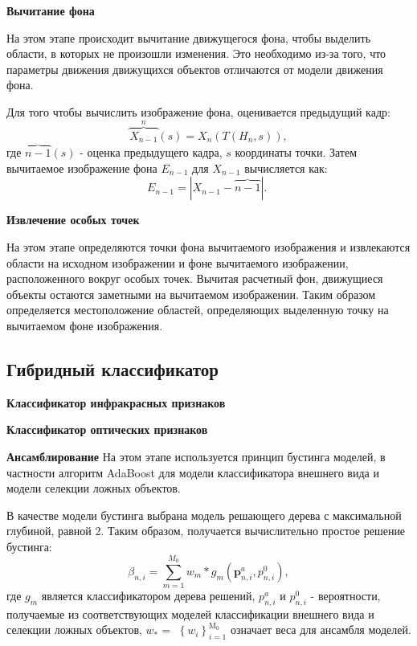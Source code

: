 \textbf{Вычитание фона}

На этом этапе происходит вычитание движущегося фона, чтобы выделить области, в которых не произошли изменения. Это необходимо из-за того, что параметры движения движущихся объектов отличаются от модели движения фона.

Для того чтобы вычислить изображение фона, оценивается предыдущий кадр:
\begin{equation}
\overbrace{X_{n-1}}^n(s)=X_n\left(T\left(H_n, s\right)\right),
\end{equation}
где $\overbrace{n-1}(s)$ - оценка предыдущего кадра, $s$ координаты точки. Затем вычитаемое изображение фона $E_{n-1}$ для $X_{n-1}$ вычисляется как:
\begin{equation}
E_{n-1}=|X_{n-1}-\overbrace{n-1}| \text {. }
\end{equation}

\textbf{Извлечение особых точек}

На этом этапе определяются точки фона вычитаемого изображения и извлекаются области на исходном изображении и фоне вычитаемого изображении, расположенного вокруг особых точек. Вычитая расчетный фон, движущиеся объекты остаются заметными на вычитаемом изображении. Таким образом определяется местоположение областей, определяющих выделенную точку на вычитаемом фоне изображения.

\subsection{Гибридный классификатор}

\textbf{Классификатор инфракрасных признаков}

\textbf{Классификатор оптических признаков}


\textbf{Ансамблирование}
На этом этапе используется принцип бустинга моделей, в частности алгоритм AdaBoost \cite{Freund1999ASI} для модели классификатора внешнего вида и модели селекции ложных объектов.

В качестве модели бустинга выбрана модель решающего дерева с максимальной глубиной, равной 2. Таким образом, получается вычислительно простое решение бустинга:
\begin{equation}
\beta_{n, i}=\sum_{m=1}^{M_0} w_m * g_m\left(\boldsymbol{p}_{n, i}^a, p_{n, i}^0\right),
\end{equation}
где $g_m$ является классификатором дерева решений, $p_{n, i}^a$ и $p_{n, i}^0$ - вероятности, получаемые из соответствующих моделей классификации внешнего вида и селекции ложных объектов, $w_*=$ $\left\{w_i\right\}_{i=1}^{\mathrm{M}_0}$ означает веса для ансамбля моделей.

